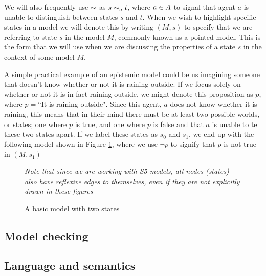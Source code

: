 We will also frequently use $\sim$ as $s\sim_a t$, where $a\in A$ to signal that agent $a$ is unable to distinguish between states $s$ and $t$. When we wish to highlight specific states in a model we will denote this by writing $(M,s)$ to specify that we are referring to state $s$ in the model $M$, commonly known as a pointed model. This is the form that we will use when we are discussing the properties of a state $s$ in the context of some model $M$. 

A simple practical example of an epistemic model could be us imagining someone that doesn't know whether or not it is raining outside. If we focus solely on whether or not it is in fact raining outside, we might denote this proposition as $p$, where $p = $``It is raining outside". Since this agent, $a$ does not know whether it is raining, this means that in their mind there must be at least two possible worlds, or states; one where $p$ is true, and one where $p$ is false and that $a$ is unable to tell these two states apart. If we label these states as $s_0$ and $s_1$, we end up with the following model shown in Figure \ref{fig:basicEM}, where we use $\neg p$ to signify that $p$ is not true in $(M,s_1)$

\begin{figure}[h]
	\label{fig:basicEM}
	\caption{A basic model with two states}
	\centering
	\break \textit{Note that since we are working with S5 models, all nodes (states) also have reflexive edges to themselves, even if they are not explicitly drawn in these figures}
\end{figure}


\subsection{Model checking}

\subsection{Language and semantics}

